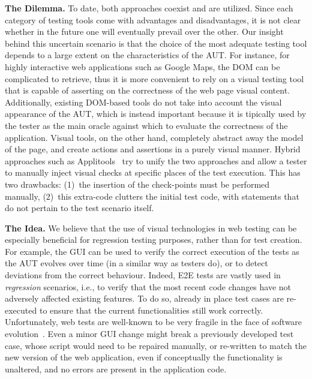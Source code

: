 \noindent
\textbf{The Dilemma.}
To date, both approaches coexist and are utilized. Since each category of testing tools come with advantages and disadvantages, it is not clear whether in the future one will eventually prevail over the other. Our insight behind this uncertain scenario is that the choice of the most adequate testing tool depends to a large extent on the characteristics of the AUT. For instance, for highly interactive web applications such as Google Maps, the DOM can be complicated to retrieve, thus it is more convenient to rely on a visual testing tool that is capable of asserting on the correctness of the web page visual content.
Additionally, existing DOM-based tools do not take into account the visual appearance of the AUT, which is instead important because it is tipically used by the tester as the main oracle against which to evaluate the correctness of the application. Visual tools, on the other hand, completely abstract away the model of the page, and create actions and assertions in a purely visual manner. 
%
Hybrid approaches such as Applitools~\cite{applitools} try to unify the two approaches and allow a tester to manually inject visual checks at specific places of the test execution. This has two drawbacks: (1)~the insertion of the check-points must be performed manually, (2)~this extra-code clutters the initial test code, with statements that do not pertain to the test scenario itself.

\noindent
\textbf{The Idea.}
We believe that the use of visual technologies in web testing can  be especially beneficial for regression testing purposes, rather than for test creation. For example, the GUI can be used to verify the correct execution of the tests as the AUT evolves over time (in a similar way as testers do), or to detect deviations from the correct behaviour.
Indeed, E2E tests are vastly used in \textit{regression} scenarios, i.e., to verify that the most recent code changes have not adversely affected existing features. To do so, already in place test cases are re-executed to ensure that the current functionalities still work correctly. 
%
Unfortunately, web tests are well-known to be very fragile in the face of software evolution~\cite{2016-leotta-Advances,2016-Leotta-JSEP,Hammoudi-2016-ICST}. %
Even a minor GUI change might break a previously developed test case, whose script would need to be repaired manually, or re-written to match the new version of the web application, even if conceptually the functionality is unaltered, and no errors are present in the application code.

